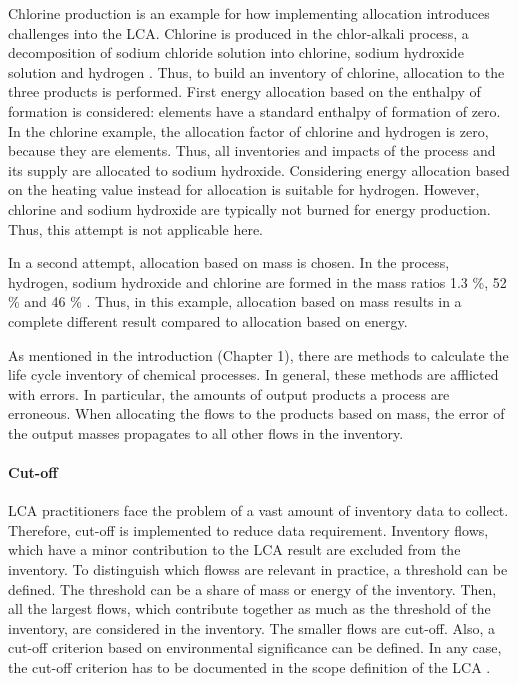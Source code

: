 Chlorine production is an example for how implementing allocation introduces challenges into the LCA. Chlorine is produced in the chlor-alkali process, a decomposition of sodium chloride solution into chlorine, sodium hydroxide solution and hydrogen  \cite{Du.2018}. Thus, to build an inventory of chlorine, allocation to the three products is performed. First energy allocation based on the enthalpy of formation is considered: elements have a standard enthalpy of formation of zero. In the chlorine example, the allocation factor of chlorine and hydrogen is zero, because they are elements. Thus, all inventories and impacts of the process and its supply are allocated to sodium hydroxide. Considering energy allocation based on the heating value instead for allocation is suitable for hydrogen. However, chlorine and sodium hydroxide are typically not burned for energy production. Thus, this attempt is not applicable here.

In a second attempt, allocation based on mass is chosen. In the process, hydrogen, sodium hydroxide and chlorine are formed in the mass ratios 1.3 \%, 52 \% and 46 \% \cite{Hischier.}. Thus, in this example, allocation based on mass results in a complete different result compared to allocation based on energy.

As mentioned in the introduction (Chapter 1), there are methods to calculate the life cycle inventory of chemical processes. In general, these methods are afflicted with errors. In particular, the amounts of output products a process are erroneous. When allocating the flows to the products based on mass, the error of the output masses propagates to all other flows in the inventory.

\paragraph{Cut-off}
LCA practitioners face the problem of a vast amount of inventory data to collect. Therefore, cut-off is implemented to reduce data requirement. Inventory flows, which have a minor contribution to the LCA result are excluded from the inventory. To distinguish which flowss are relevant in practice, a threshold can be defined. The threshold can be a share of mass or energy of the inventory. Then, all the largest flows, which contribute together as much as the threshold of the inventory,  are considered in the inventory. The smaller flows are cut-off. Also, a cut-off criterion based on environmental significance can be defined. In any case, the cut-off criterion has to be documented in the scope definition of the LCA \cite{InternationalOrganizationforStandardization.2006b}.
 
